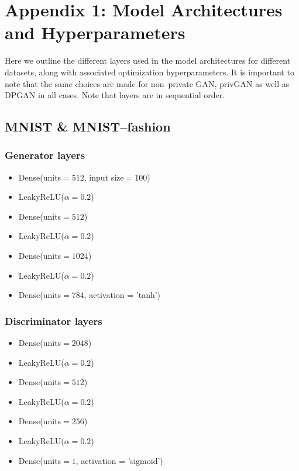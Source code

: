 \documentclass{article}
\begin{document}
\section*{Appendix 1: Model Architectures and Hyperparameters}
Here we outline the different layers used in the model architectures for different datasets, along with associated optimization hyperparameters. It is important to note that the same choices are made for non--private GAN, privGAN as well as DPGAN in all cases. Note that layers are in sequential order. 

\subsection*{MNIST \& MNIST--fashion}
\subsubsection*{Generator layers}
\begin{itemize}
\itemsep0em
    \item Dense(units$=512$, input size$=100$)
    \item LeakyReLU($\alpha=0.2$)
    \item Dense(units$=512$)
    \item LeakyReLU($\alpha=0.2$)
    \item Dense(units$=1024$)
    \item LeakyReLU($\alpha=0.2$)
    \item Dense(units$=784$, activation = 'tanh')
\end{itemize}

\subsubsection*{Discriminator layers}
\begin{itemize}
\itemsep0em
    \item Dense(units$=2048$)
    \item LeakyReLU($\alpha=0.2$)
    \item Dense(units$=512$)
    \item LeakyReLU($\alpha=0.2$)
    \item Dense(units$=256$)
    \item LeakyReLU($\alpha=0.2$)
    \item Dense(units$=1$, activation = 'sigmoid')
\end{itemize}
\end{document}

